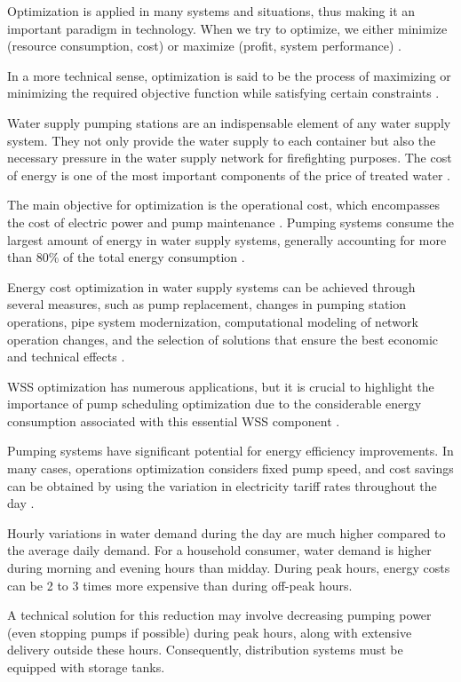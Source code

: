 Optimization is applied in many systems and situations, thus making it an important paradigm in technology. When we try to optimize, we either minimize (resource consumption, cost) or maximize (profit, system performance) \cite{rfc19}.


In a more technical sense, optimization is said to be the process of maximizing or minimizing the required objective function while satisfying certain constraints \cite{rfc21}.

Water supply pumping stations are an indispensable element of any water supply system. They not only provide the water supply to each container but also the necessary pressure in the water supply network for firefighting purposes. The cost of energy is one of the most important components of the price of treated water \cite{rfc7}.

The main objective for optimization is the operational cost, which encompasses the cost of electric power and pump maintenance \cite{rfc2}. Pumping systems consume the largest amount of energy in water supply systems, generally accounting for more than 80\% of the total energy consumption \cite{rfc8}.

Energy cost optimization in water supply systems can be achieved through several measures, such as pump replacement, changes in pumping station operations, pipe system modernization, computational modeling of network operation changes, and the selection of solutions that ensure the best economic and technical effects \cite{rfc7}.

WSS optimization has numerous applications, but it is crucial to highlight the importance of pump scheduling optimization due to the considerable energy consumption associated with this essential WSS component \cite{rfc20}.

Pumping systems have significant potential for energy efficiency improvements. In many cases, operations optimization considers fixed pump speed, and cost savings can be obtained by using the variation in electricity tariff rates throughout the day \cite{rfc8}.

Hourly variations in water demand during the day are much higher compared to the average daily demand. For a household consumer, water demand is higher during morning and evening hours than midday. During peak hours, energy costs can be 2 to 3 times more expensive than during off-peak hours.

A technical solution for this reduction may involve decreasing pumping power (even stopping pumps if possible) during peak hours, along with extensive delivery outside these hours. Consequently, distribution systems must be equipped with storage tanks.



